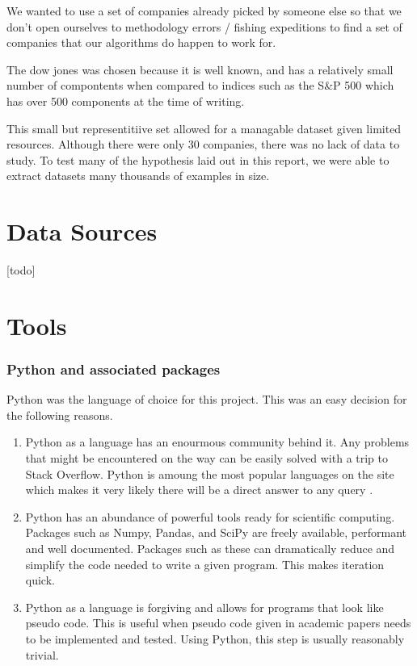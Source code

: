 \documentclass{report}
\begin{document}
We wanted to use a set of companies already picked by someone else so that we don't open ourselves to methodology errors / fishing expeditions to find a set of companies that our algorithms do happen to work for. 

The dow jones was chosen because it is well known, and has a relatively small number of compontents when compared to indices such as the S\&P 500 which has over 500 components at the time of writing. 

This small but representitiive set allowed for a managable dataset given limited resources. Although there were only 30 companies, there was no lack of data to study. To test many of the hypothesis laid out in this report, we were able to extract datasets many thousands of examples in size.

\section{Data Sources}

[todo]

\section{Tools}
\subsubsection{Python and associated packages}

Python was the language of choice for this project. This was an easy decision for the following reasons.

\begin{enumerate}
  \item Python as a language has an enourmous community behind it. Any problems that might be encountered on the way can be easily solved with a trip to Stack Overflow. Python is amoung the most popular languages on the site which makes it very likely there will be a direct answer to any query \cite{website:redmonk-languages}. 
  
  \item Python has an abundance of powerful tools ready for scientific computing. Packages such as Numpy, Pandas, and SciPy are freely available, performant and well documented. Packages such as these can dramatically reduce and simplify the code needed to write a given program. This makes iteration quick.

  \item Python as a language is forgiving and allows for programs that look like pseudo code. This is useful when pseudo code given in academic papers needs to be implemented and tested. Using Python, this step is usually reasonably trivial.

\end{enumerate}
\end{document}
